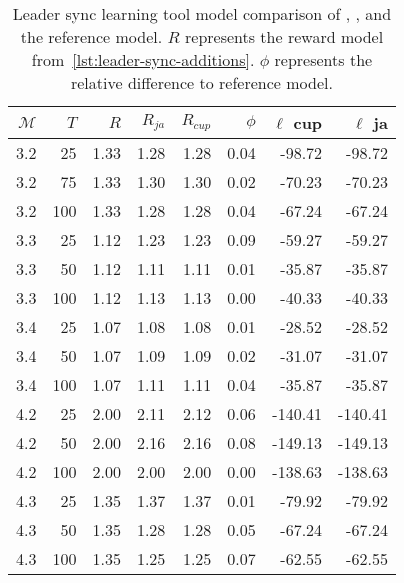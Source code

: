 \begin{table}
    \centering
    \caption{Leader sync learning tool model comparison of \Cupaal, \Jajapy, and the reference model. $R$ represents the reward model from~\autoref{lst:leader-sync-additions}. $\phi$ represents the relative difference to reference model.}
    \label{tab:leader-results-accuracy}
    \begin{tabular}{rrrrrrrr}
        \toprule
        $\mathcal{M}$ & $T$ & $R$  & $R_{ja}$ & $R_{cup}$ & $\phi$ & $\ell$ cup & $\ell$ ja \\
        \midrule
        3.2           & 25  & 1.33 & 1.28     & 1.28      & 0.04   & -98.72     & -98.72    \\
        3.2           & 75  & 1.33 & 1.30     & 1.30      & 0.02   & -70.23     & -70.23    \\
        3.2           & 100 & 1.33 & 1.28     & 1.28      & 0.04   & -67.24     & -67.24    \\
        3.3           & 25  & 1.12 & 1.23     & 1.23      & 0.09   & -59.27     & -59.27    \\
        3.3           & 50  & 1.12 & 1.11     & 1.11      & 0.01   & -35.87     & -35.87    \\
        3.3           & 100 & 1.12 & 1.13     & 1.13      & 0.00   & -40.33     & -40.33    \\
        3.4           & 25  & 1.07 & 1.08     & 1.08      & 0.01   & -28.52     & -28.52    \\
        3.4           & 50  & 1.07 & 1.09     & 1.09      & 0.02   & -31.07     & -31.07    \\
        3.4           & 100 & 1.07 & 1.11     & 1.11      & 0.04   & -35.87     & -35.87    \\
        4.2           & 25  & 2.00 & 2.11     & 2.12      & 0.06   & -140.41    & -140.41   \\
        4.2           & 50  & 2.00 & 2.16     & 2.16      & 0.08   & -149.13    & -149.13   \\
        4.2           & 100 & 2.00 & 2.00     & 2.00      & 0.00   & -138.63    & -138.63   \\
        4.3           & 25  & 1.35 & 1.37     & 1.37      & 0.01   & -79.92     & -79.92    \\
        4.3           & 50  & 1.35 & 1.28     & 1.28      & 0.05   & -67.24     & -67.24    \\
        4.3           & 100 & 1.35 & 1.25     & 1.25      & 0.07   & -62.55     & -62.55    \\

\end{tabular}
\end{table}
